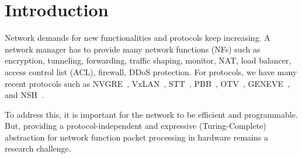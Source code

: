 \section{Introduction}
\label{sec:intro}

Network demands for new functionalities and protocols keep increasing. A network manager has to provide many network functions (NFs) such as encryption, tunneling, forwarding, traffic shaping, monitor, NAT, load balancer, access control list (ACL), firewall, DDoS protection. For protocols, we have many recent protocols such as NVGRE~\cite{rfc7637}, VxLAN~\cite{mahalingam2013}, STT~\cite{davie2014stt}, PBB~\cite{kishjac-bmwg-evpntest-08}, OTV~\cite{hasmit-otv-04}, GENEVE~\cite{ietf-nvo3-geneve-05}, and NSH~\cite{rfc8300}.

To address this, it is important for the network to be efficient and programmable. But, providing a protocol-independent and expressive (Turing-Complete) abstraction for network function packet processing in hardware remains a research challenge.



 

